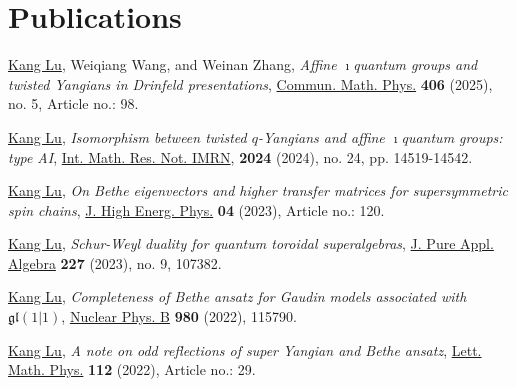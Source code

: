 \documentclass[11pt,letterpaper,roman,colorlinks,urlcolor=blue,linkcolor=blue
]{moderncv}
\begin{document}
\section{Publications}

\begin{etaremune}[leftmargin=1.17cm]
\item \underline{Kang Lu}, Weiqiang Wang, and Weinan Zhang, {\textit{Affine 
$\imath$quantum groups and twisted Yangians in Drinfeld presentations}}, \href{https://link.springer.com/article/10.1007/s00220-025-05263-z}{Commun. Math. Phys.} \textbf{406} (2025), no. 5, Article no.: 98.

\item \underline{Kang Lu}, {\textit{Isomorphism between twisted $q$-Yangians and affine $\imath$quantum groups: type AI}}, \href{https://academic.oup.com/imrn/advance-article/doi/10.1093/imrn/rnae248/7876238?utm_source=authortollfreelink&utm_campaign=imrn&utm_medium=email&guestAccessKey=2a26413f-ccaf-4e39-b671-466ba0c7722a}{Int. Math. Res. Not. IMRN},  \textbf{2024} (2024), no. 24, pp. 14519-14542.

\item \underline{Kang Lu}, {\textit{On Bethe eigenvectors and higher transfer matrices for supersymmetric spin chains}}, \href{https://doi.org/10.1007/JHEP04(2023)120}{J. High Energ. Phys.} \textbf{04} (2023), Article no.: 120.

\item \underline{Kang Lu}, {\textit{Schur-Weyl duality for quantum toroidal superalgebras}}, \href{https://doi.org/10.1016/j.jpaa.2023.107382}{J. Pure Appl. Algebra} \textbf{227} (2023), no. 9, 107382.


\item \underline{Kang Lu}, {\textit{Completeness of Bethe ansatz for Gaudin models associated with} $\mathfrak{gl}(1|1)$}, \href{https://www.sciencedirect.com/science/article/pii/S0550321322001419}{Nuclear Phys. B} \textbf{980} (2022), 115790.

\item \underline{Kang Lu}, {\textit{A note on odd reflections of super Yangian and Bethe ansatz}}, \href{https://link.springer.com/article/10.1007/s11005-022-01524-3}{Lett. Math. Phys.} \textbf{112} (2022), Article no.: 29.


\end{etaremune}
\end{document}
